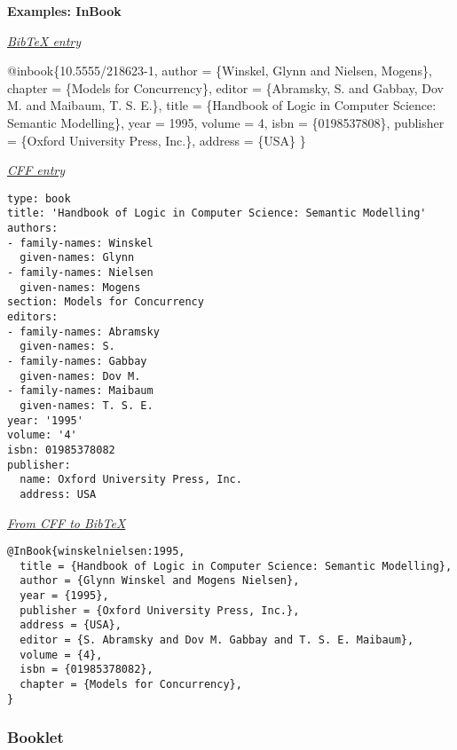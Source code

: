 \documentclass[
]{article}
\newenvironment{Shaded}{\begin{snugshade}}{\end{snugshade}}
\newcommand{\DataTypeTok}[1]{\textcolor[rgb]{0.13,0.29,0.53}{#1}}
\newcommand{\NormalTok}[1]{#1}
\newcommand{\OtherTok}[1]{\textcolor[rgb]{0.56,0.35,0.01}{#1}}
\newcommand{\VariableTok}[1]{\textcolor[rgb]{0.00,0.00,0.00}{#1}}
\begin{document}
\textbf{Examples: InBook}

\underline{\emph{BibTeX entry}}

\begin{Shaded}
\begin{Highlighting}[]
\VariableTok{@inbook}\NormalTok{\{}\OtherTok{10}\NormalTok{.}\OtherTok{5555}\NormalTok{/}\OtherTok{218623}\NormalTok{{-}}\OtherTok{1}\NormalTok{,}
    \DataTypeTok{author}\NormalTok{       = \{Winskel, Glynn and Nielsen, Mogens\},}
    \DataTypeTok{chapter}\NormalTok{      = \{Models for Concurrency\},}
    \DataTypeTok{editor}\NormalTok{       = \{Abramsky, S. and Gabbay, Dov M. and Maibaum, T. S. E.\},}
    \DataTypeTok{title}\NormalTok{        = \{Handbook of Logic in Computer Science: Semantic Modelling\},}
    \DataTypeTok{year}\NormalTok{         = 1995,}
    \DataTypeTok{volume}\NormalTok{       = 4,}
    \DataTypeTok{isbn}\NormalTok{         = \{0198537808\},}
    \DataTypeTok{publisher}\NormalTok{    = \{Oxford University Press, Inc.\},}
    \DataTypeTok{address}\NormalTok{      = \{USA\}}
\NormalTok{\}}
\end{Highlighting}
\end{Shaded}

\underline{\emph{CFF entry}}

\begin{verbatim}
type: book
title: 'Handbook of Logic in Computer Science: Semantic Modelling'
authors:
- family-names: Winskel
  given-names: Glynn
- family-names: Nielsen
  given-names: Mogens
section: Models for Concurrency
editors:
- family-names: Abramsky
  given-names: S.
- family-names: Gabbay
  given-names: Dov M.
- family-names: Maibaum
  given-names: T. S. E.
year: '1995'
volume: '4'
isbn: 01985378082
publisher:
  name: Oxford University Press, Inc.
  address: USA
\end{verbatim}

\underline{\emph{From CFF to BibTeX}}

\begin{verbatim}
@InBook{winskelnielsen:1995,
  title = {Handbook of Logic in Computer Science: Semantic Modelling},
  author = {Glynn Winskel and Mogens Nielsen},
  year = {1995},
  publisher = {Oxford University Press, Inc.},
  address = {USA},
  editor = {S. Abramsky and Dov M. Gabbay and T. S. E. Maibaum},
  volume = {4},
  isbn = {01985378082},
  chapter = {Models for Concurrency},
}
\end{verbatim}

\hypertarget{booklet}{%
\subsubsection{Booklet}\label{booklet}}
\end{document}
